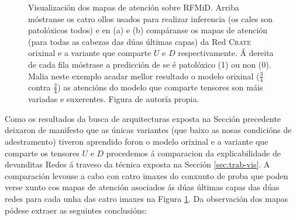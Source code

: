 \begin{figure}[!htbp]
\begin{subfigure}{\textwidth}
    \end{subfigure}
		\caption[Visualización dos mapas de atención sobre RFMiD. Figura de autoría propia.]{Visualización dos mapas de atención sobre RFMiD. Arriba móstranse os catro ollos usados para realizar inferencia (os cales son patolóxicos todos) e en (a) e (b) compáranse os mapas de atención (para todas as cabezas das dúas últimas capas) da Red \textsc{Crate} orixinal e a variante que comparte $U$ e $D$ respectivamente. Á dereita de cada fila móstrase a predicción de se é patolóxico (1) ou non (0). Malia neste exemplo acadar mellor resultado o modelo orixinal ($\frac{3}{4}$ contra $\frac{2}{4}$) as atencións do modelo que comparte tensores son máis variadas e suxerentes. Figura de autoría propia.}
    \label{fig:visat-rfmid}
\end{figure}

Como os resultados da busca de arquitecturas exposta na Sección precedente deixaron de manifesto que as únicas variantes (que baixo as nosas condicións de adestramento) tiveron aprendido foron o modelo orixinal e a variante que comparte os tensores $U$ e $D$ procedemos á comparacion da \gls{explicabilidade} de devanditas Redes á traveso da técnica exposta na Sección \ref{sec:trab-vis}. A comparación levouse a cabo con catro imaxes do conxunto de proba que poden verse xunto cos mapas de atención asociados ás dúas últimas capas das dúas redes para cada unha das catro imaxes na Figura \ref{fig:visat-rfmid}. Da observación dos mapas pódese extraer as seguintes conclusións:

